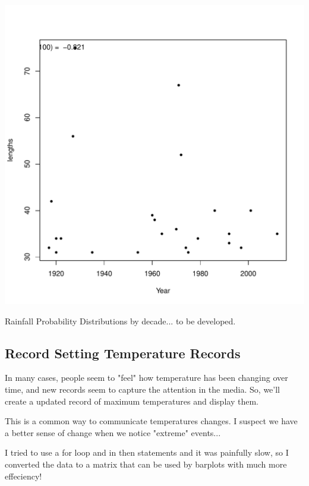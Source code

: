\documentclass{article}\usepackage[]{graphicx}\usepackage[]{color}
\makeatletter
\def\maxwidth{ %
  \ifdim\Gin@nat@width>\linewidth
    \linewidth
  \else
    \Gin@nat@width
  \fi
}
\newenvironment{kframe}{%
 \def\at@end@of@kframe{}%
 \ifinner\ifhmode%
  \def\at@end@of@kframe{\end{minipage}}%
  \begin{minipage}{\columnwidth}%
 \fi\fi%
 \def\FrameCommand##1{\hskip\@totalleftmargin \hskip-\fboxsep
 \colorbox{shadecolor}{##1}\hskip-\fboxsep
     \hskip-\linewidth \hskip-\@totalleftmargin \hskip\columnwidth}%
 \MakeFramed {\advance\hsize-\width
   \@totalleftmargin\z@ \linewidth\hsize
   \@setminipage}}%
 {\par\unskip\endMakeFramed%
 \at@end@of@kframe}
\newenvironment{knitrout}{}{} %
\makeatother
\begin{document}
\begin{knitrout}
\begin{kframe}
{\ttfamily\noindent\bfseries\color{errorcolor}{\#\# Error in is.data.frame(data): object 'Drought.run.100' not found}}\end{kframe}
\includegraphics[width=\maxwidth]{figure/unnamed-chunk-10-2} 
\end{knitrout}

Rainfall Probability Distributions by decade... to be developed.





\subsection{Record Setting Temperature Records}

In many cases, people seem to "feel" how temperature has been changing over time, and new records seem to capture the attention in the media. So, we'll create a updated record of maximum temperatures and display them. 





This is a common way to communicate temperatures changes. I suspect we have a better sense of change when we notice "extreme" events...






I tried to use a for loop and in then statements and it was painfully slow, so I converted the data to a matrix that can be used by barplots with much more effeciency!
\end{document}
